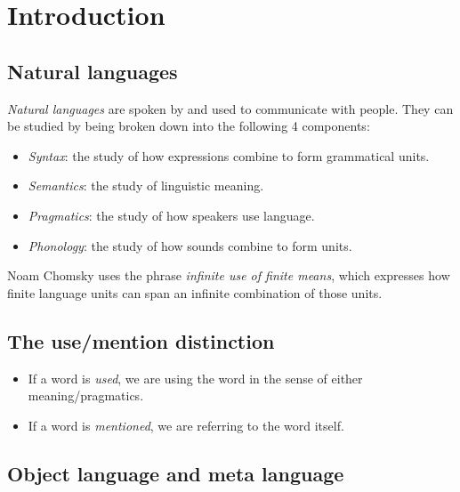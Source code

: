 \chapter{Introduction}

\section{Natural languages}

\emph{Natural languages} are spoken by and used to communicate with people. They can be studied by being broken down into the following 4 components:

\begin{definition}\leavevmode
\begin{itemize}
  \item \emph{Syntax}: the study of how expressions combine to form grammatical units.
  \item \emph{Semantics}: the study of linguistic meaning.
  \item \emph{Pragmatics}: the study of how speakers use language.
  \item \emph{Phonology}: the study of how sounds combine to form units.
\end{itemize}
\end{definition}

\begin{note}
Noam Chomsky uses the phrase \emph{infinite use of finite means}, which expresses how finite language units can span an infinite combination of those units.
\end{note}

\section{The use/mention distinction}

\begin{itemize}
  \item If a word is \emph{used}, we are using the word in the sense of either meaning/pragmatics.
  \item If a word is \emph{mentioned}, we are referring to the word itself.
\end{itemize}

\section{Object language and meta language}

